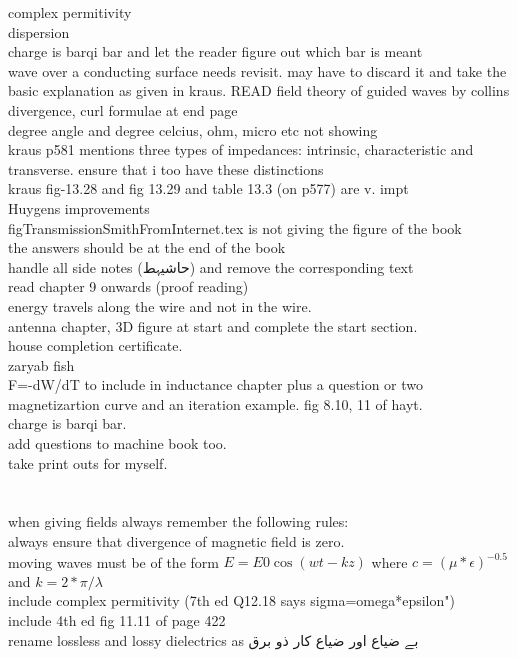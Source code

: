 \begin{otherlanguage}{english}
complex permitivity\\
dispersion\\
charge is barqi bar and let the reader figure out which bar is meant\\
wave over a conducting surface needs revisit. may have to discard it and take the basic explanation as given in kraus. READ field theory of guided waves by collins \\
divergence, curl formulae at end page\\
degree angle and degree celcius, ohm, micro etc not showing\\
kraus p581 mentions three types of impedances: intrinsic, characteristic and transverse. ensure that i too have these distinctions\\
kraus fig-13.28 and fig 13.29 and table 13.3 (on p577) are v. impt\\
Huygens improvements\\
figTransmissionSmithFromInternet.tex is not giving the figure of the book\\
the answers should be at the end of the book\\
handle all side notes (حاشیہط) and remove the corresponding text\\
read chapter 9 onwards (proof reading)\\
energy travels along the wire and not in the wire.\\
antenna chapter, 3D figure at start and complete the start section.\\
house completion certificate.\\
zaryab fish\\
F=-dW/dT to include in inductance chapter plus a question or two\\
magnetizartion curve and an iteration example. fig 8.10, 11 of hayt.\\
charge is barqi bar.\\
add questions to machine book too.\\
take print outs for myself.\\
\\
\\
when giving fields always remember the following rules:\\
always ensure that divergence of magnetic field is zero.\\
moving waves must be of the form $E=E0 \cos(wt-kz)$ where $c=(\mu*\epsilon)^{-0.5}$ and $k=2*\pi/\lambda$\\
include complex permitivity  (7th ed Q12.18 says sigma=omega*epsilon")\\
include 4th ed fig 11.11 of page 422\\
rename lossless and lossy dielectrics as بے ضیاع اور ضیاع کار ذو برق
\end{otherlanguage}
